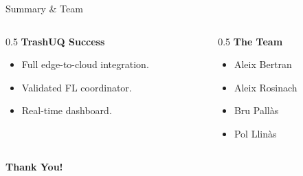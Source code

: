 \documentclass[aspectratio=169, 12pt]{beamer}
\begin{document}
\begin{frame}{Summary \& Team}
    \begin{columns}
        \begin{column}{0.5\textwidth}
            \textbf{TrashUQ Success}
            \begin{itemize}
                \item Full edge-to-cloud integration.
                \item Validated FL coordinator.
                \item Real-time dashboard.
            \end{itemize}
        \end{column}
        \begin{column}{0.5\textwidth}
            \textbf{The Team}
            \begin{itemize}
                \item Aleix Bertran
                \item Aleix Rosinach
                \item Bru Pallàs
                \item Pol Llinàs
            \end{itemize}
        \end{column}
    \end{columns}
    \vspace{1cm}
    \centering \Huge \textbf{Thank You!}
\end{frame}
\end{document}
